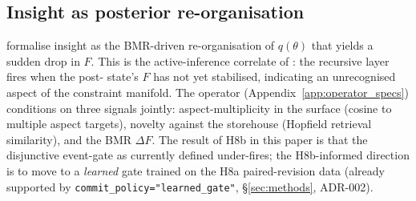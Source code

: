 \subsection{Insight as posterior re-organisation}

\citet{Friston2017ActiveInferenceCuriosity} formalise insight as the BMR-driven re-organisation of $q(\theta)$ that yields a sudden drop in $F$. This is the active-inference correlate of : the recursive layer fires when the post- state's $F$ has not yet stabilised, indicating an unrecognised aspect of the constraint manifold. The  operator (Appendix~\ref{app:operator_specs}) conditions on three signals jointly: aspect-multiplicity in the surface (cosine to multiple aspect targets), novelty against the storehouse (Hopfield retrieval similarity), and the BMR $\Delta F$. The result of H8b in this paper is that the disjunctive event-gate as currently defined under-fires; the H8b-informed direction is to move to a \emph{learned} gate trained on the H8a paired-revision data (already supported by \texttt{commit\_policy="learned\_gate"}, \S\ref{sec:methods}, ADR-002).

